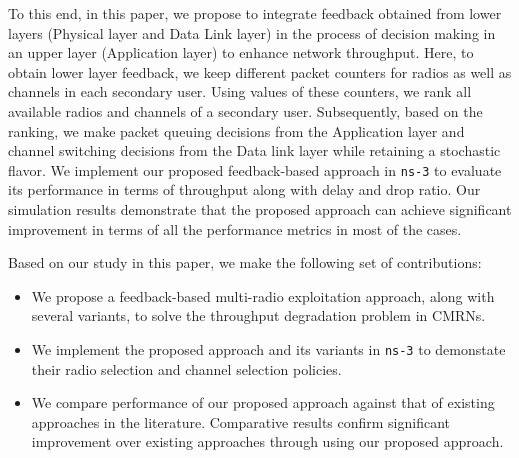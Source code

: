 To this end, in this paper, we propose to integrate feedback obtained from lower layers (Physical layer and Data Link layer) in the process of decision making in an upper layer (Application layer) to enhance network throughput. Here, to obtain lower layer feedback, we keep different packet counters for radios as well as channels in each secondary user. Using values of these counters, we rank all available radios and channels of a secondary user. Subsequently, based on the ranking, we make packet queuing decisions from the Application layer and channel switching decisions from the Data link layer while retaining a stochastic flavor. We implement our proposed feedback-based approach in \texttt{ns-3} to evaluate its performance in terms of throughput along with delay and drop ratio. Our simulation results demonstrate that the proposed approach can achieve significant improvement in terms of all the performance metrics in most of the cases.



Based on our study in this paper, we make the following set of contributions:

\begin{itemize}
\item We propose a feedback-based multi-radio exploitation approach, along with several variants, to solve the throughput degradation problem in CMRNs.
\item We implement the proposed approach and its variants in \texttt{ns-3} to demonstate their radio selection and channel selection policies.
\item We compare performance of our proposed approach against that of existing approaches in the literature. Comparative results confirm significant improvement over existing approaches through using our proposed approach.
\end{itemize}
\endinput
